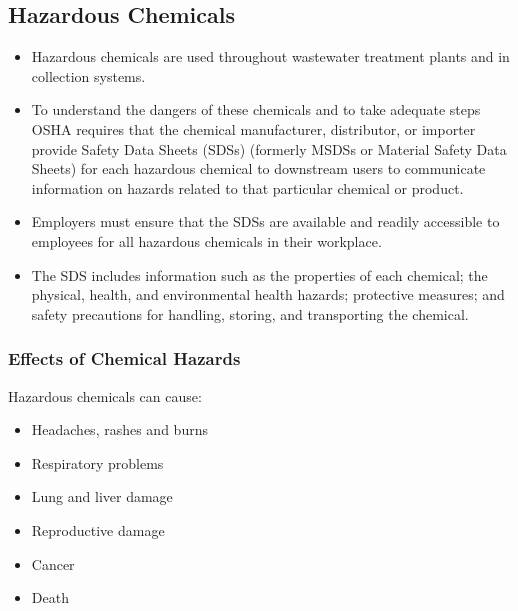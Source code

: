 \subsection{Hazardous Chemicals}
\begin{itemize}
\item Hazardous chemicals are used throughout wastewater treatment plants and in collection systems. 
\item To understand the dangers of these chemicals and to take adequate steps OSHA requires that the chemical manufacturer, distributor, or importer provide Safety Data Sheets (SDSs) (formerly MSDSs or Material Safety Data Sheets) for each hazardous chemical to downstream users to communicate information on hazards related to that particular chemical or product.
\item Employers must ensure that the SDSs are available and readily accessible to employees for all hazardous chemicals in their workplace.
\item The SDS includes information such as the properties of each chemical; the physical, health, and environmental health hazards; protective measures; and safety precautions for handling, storing, and transporting the chemical.\\
\end{itemize}


\subsubsection{Effects of Chemical Hazards}

Hazardous chemicals can cause:
\begin{itemize}
\item Headaches, rashes and burns
\item Respiratory problems
\item Lung and liver damage
\item Reproductive damage
\item Cancer
\item Death
\end{itemize} 


